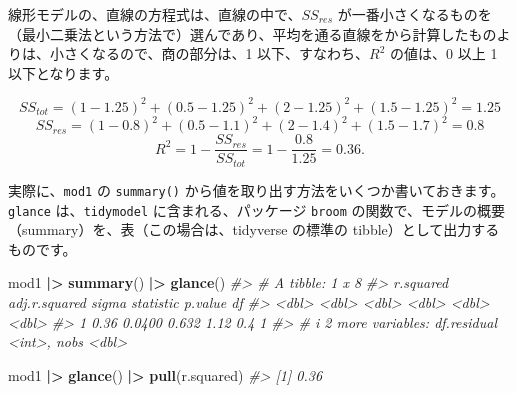 \documentclass[
  xelatex, ja=standard]{bxjsbook}
\newenvironment{Shaded}{\begin{snugshade}}{\end{snugshade}}
\newcommand{\CommentTok}[1]{\textcolor[rgb]{0.56,0.35,0.01}{\textit{#1}}}
\newcommand{\FunctionTok}[1]{\textcolor[rgb]{0.13,0.29,0.53}{\textbf{#1}}}
\newcommand{\NormalTok}[1]{#1}
\newcommand{\SpecialCharTok}[1]{\textcolor[rgb]{0.81,0.36,0.00}{\textbf{#1}}}
\theoremstyle{definition}
\theoremstyle{definition}
\theoremstyle{definition}
\theoremstyle{definition}
\theoremstyle{remark}
\begin{document}
線形モデルの、直線の方程式は、直線の中で、\(SS_{res}\) が一番小さくなるものを（最小二乗法という方法で）選んであり、平均を通る直線をから計算したものよりは、小さくなるので、商の部分は、1 以下、すなわち、\(R^2\) の値は、0 以上 1 以下となります。

\[SS_{tot} = (1-1.25)^2 + (0.5-1.25)^2 + (2-1.25)^2 + (1.5-1.25)^2 = 1.25\] \[SS_{res} = (1-0.8)^2 + (0.5-1.1)^2 + (2-1.4)^2 + (1.5-1.7)^2 = 0.8\] \[R^2 = 1 - \frac{SS_{res}}{SS_{tot}} = 1- \frac{0.8}{1.25} = 0.36.\]

実際に、\texttt{mod1} の \texttt{summary()} から値を取り出す方法をいくつか書いておきます。\texttt{glance} は、\texttt{tidymodel} に含まれる、パッケージ \texttt{broom} の関数で、モデルの概要（summary）を、表（この場合は、tidyverse の標準の tibble）として出力するものです。

\begin{Shaded}
\end{Shaded}

\begin{Shaded}
\begin{Highlighting}[]
\NormalTok{mod1 }\SpecialCharTok{|\textgreater{}} \FunctionTok{summary}\NormalTok{() }\SpecialCharTok{|\textgreater{}} \FunctionTok{glance}\NormalTok{()}
\CommentTok{\#\textgreater{} \# A tibble: 1 x 8}
\CommentTok{\#\textgreater{}   r.squared adj.r.squared sigma statistic p.value    df}
\CommentTok{\#\textgreater{}       \textless{}dbl\textgreater{}         \textless{}dbl\textgreater{} \textless{}dbl\textgreater{}     \textless{}dbl\textgreater{}   \textless{}dbl\textgreater{} \textless{}dbl\textgreater{}}
\CommentTok{\#\textgreater{} 1      0.36        0.0400 0.632      1.12     0.4     1}
\CommentTok{\#\textgreater{} \# i 2 more variables: df.residual \textless{}int\textgreater{}, nobs \textless{}dbl\textgreater{}}
\end{Highlighting}
\end{Shaded}

\begin{Shaded}
\begin{Highlighting}[]
\NormalTok{mod1 }\SpecialCharTok{|\textgreater{}} \FunctionTok{glance}\NormalTok{() }\SpecialCharTok{|\textgreater{}} \FunctionTok{pull}\NormalTok{(r.squared)}
\CommentTok{\#\textgreater{} [1] 0.36}
\end{Highlighting}
\end{Shaded}
\end{document}

